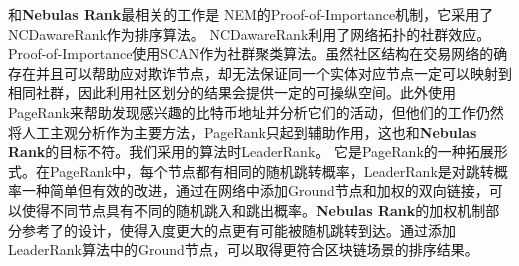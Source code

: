 和\textbf{Nebulas Rank}最相关的工作是 NEM\cite{nem}的Proof-of-Importance机制，它采用了 NCDawareRank\cite{Nikolakopoulos2013}作为排序算法。 NCDawareRank\cite{Nikolakopoulos2013}利用了网络拓扑的社群效应。Proof-of-Importance使用SCAN\cite{xu2007scan}\cite{shiokawa2015scan}\cite{chang2017mathsf}作为社群聚类算法。虽然社区结构在交易网络的确存在并且可以帮助应对欺诈节点，却无法保证同一个实体对应节点一定可以映射到相同社群，因此利用社区划分的结果会提供一定的可操纵空间。此外\textcite{Fleder2015}使用PageRank来帮助发现感兴趣的比特币地址并分析它们的活动，但他们的工作仍然将人工主观分析作为主要方法，PageRank只起到辅助作用，这也和\textbf{Nebulas Rank}的目标不符。我们采用的算法时LeaderRank\cite{Chen2013}\cite{Li2014}。 它是PageRank的一种拓展形式。在PageRank中，每个节点都有相同的随机跳转概率，LeaderRank是对跳转概率一种简单但有效的改进，通过在网络中添加Ground节点和加权的双向链接，可以使得不同节点具有不同的随机跳入和跳出概率。\textbf{Nebulas Rank}的加权机制部分参考了\textcite{Li2014}的设计，使得入度更大的点更有可能被随机跳转到达。通过添加LeaderRank算法中的Ground节点，可以取得更符合区块链场景的排序结果。

